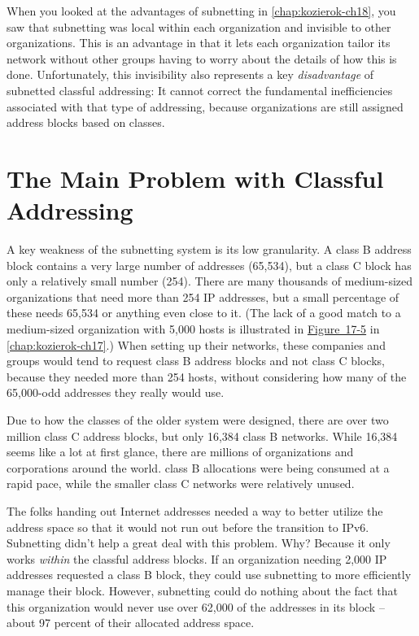 When you looked at the advantages of subnetting in
\cref{chap:kozierok-ch18}, you saw that subnetting was
local within each organization and invisible to other organizations.
This is an advantage in that it lets each organization tailor its
network without other groups having to worry about the details of how
this is done. Unfortunately, this invisibility also represents a key
{\emph{disadvantage}} of subnetted classful addressing: It cannot
correct the fundamental inefficiencies associated with that type of
addressing, because organizations are still assigned address blocks
based on classes.

\section{The Main Problem with Classful Addressing}

A key weakness of the subnetting system is its low
granularity. A
class B address block contains a very large number of addresses
(65,534), but a class C block has only a relatively small number (254).
There are many thousands of medium-sized organizations that need more
than 254 IP addresses, but a small percentage of these needs 65,534 or
anything even close to it. (The lack of a good match to a medium-sized
organization with 5,000 hosts is illustrated in
\protect\hyperlink{ch17s07.htmlux5cux23the_main_problem_with_classful_addressin}{Figure~17-5} in \vref{chap:kozierok-ch17}.)
When setting up their
networks, these companies and groups would tend to request class B
address blocks and not class C blocks, because they needed more than 254
hosts, without considering how many of the 65,000-odd addresses they
really would use.

Due to how the classes of the older system were designed, there are over
two million class C address blocks, but only 16,384 class B networks.
While 16,384 seems like a lot at first glance, there are millions of
organizations and corporations around the world. class B allocations
were being consumed at a rapid pace, while the smaller class C networks
were relatively unused.

The folks handing out Internet addresses needed a way to better utilize
the address space so that it would not run out before the transition to
IPv6. Subnetting didn't help a great deal with this problem. Why?
Because it only works {\emph{within}} the classful address blocks. If an
organization needing 2,000 IP addresses requested a class B block, they
could use subnetting to more efficiently manage their block. However,
subnetting could do nothing about the fact that this organization would
never use over 62,000 of the addresses in its block -- about 97 percent
of their allocated address space.


